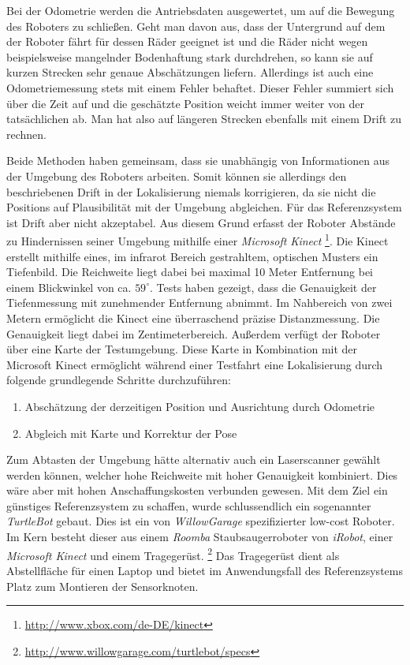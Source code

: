 Bei der Odometrie werden die Antriebsdaten ausgewertet, um auf die Bewegung
des Roboters zu schließen. Geht man davon aus, dass der Untergrund auf dem der
Roboter fährt für dessen Räder geeignet ist und die Räder nicht wegen
beispielsweise mangelnder Bodenhaftung stark durchdrehen, so kann sie auf
kurzen Strecken sehr genaue Abschätzungen liefern. Allerdings ist auch eine
Odometriemessung stets mit einem Fehler behaftet. Dieser Fehler summiert sich
über die Zeit auf und die geschätzte Position weicht immer weiter von der
tatsächlichen ab. Man hat also auf längeren Strecken ebenfalls mit einem Drift
zu rechnen.

Beide Methoden haben gemeinsam, dass sie unabhängig von Informationen aus der
Umgebung des Roboters arbeiten. Somit können sie allerdings den beschriebenen
Drift in der Lokalisierung niemals korrigieren, da sie nicht die Positions auf
Plausibilität mit der Umgebung abgleichen.  Für das Referenzsystem ist Drift
aber nicht akzeptabel. Aus diesem Grund erfasst der Roboter Abstände zu
Hindernissen seiner Umgebung mithilfe einer \textit{Microsoft Kinect}
\footnote{\url{http://www.xbox.com/de-DE/kinect}}. Die
Kinect erstellt mithilfe eines, im infrarot Bereich gestrahltem, optischen
Musters ein Tiefenbild.  Die Reichweite liegt dabei bei maximal 10 Meter
Entfernung bei einem Blickwinkel von ca. $59^{\circ}$.
Tests haben gezeigt, dass die Genauigkeit der Tiefenmessung mit zunehmender
Entfernung abnimmt. Im Nahbereich von zwei Metern ermöglicht die Kinect eine überraschend präzise
Distanzmessung. Die Genauigkeit liegt dabei im Zentimeterbereich.  Außerdem verfügt der Roboter
über eine Karte der Testumgebung. Diese Karte in Kombination mit der
Microsoft Kinect ermöglicht während einer Testfahrt eine Lokalisierung
durch folgende grundlegende Schritte durchzuführen:

\begin{enumerate}
  \item Abschätzung der derzeitigen Position und Ausrichtung durch Odometrie
  \item Abgleich mit Karte und Korrektur der Pose
\end{enumerate}

Zum Abtasten der Umgebung hätte alternativ auch ein Laserscanner gewählt werden
können, welcher hohe Reichweite mit hoher Genauigkeit kombiniert. Dies wäre
aber mit hohen Anschaffungskosten verbunden gewesen. Mit dem Ziel ein günstiges
Referenzsystem zu schaffen, wurde schlussendlich ein sogenannter
\textit{TurtleBot} gebaut. Dies ist ein von \textit{WillowGarage}
spezifizierter low-cost Roboter.
Im Kern besteht dieser aus einem \textit{Roomba} Staubsaugerroboter von
\textit{iRobot}, einer \textit{Microsoft Kinect} und einem Tragegerüst. 
\footnote{\url{http://www.willowgarage.com/turtlebot/specs}}
Das Tragegerüst dient als Abstellfläche für einen Laptop und bietet im
Anwendungsfall des Referenzsystems Platz zum Montieren der Sensorknoten.

